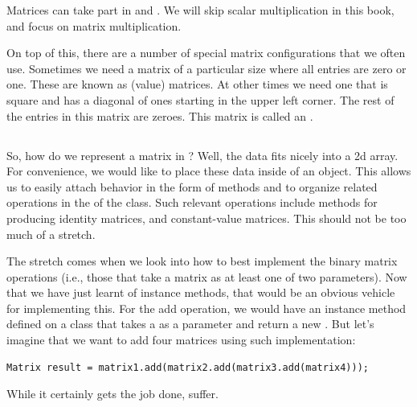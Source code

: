 Matrices can take part in  and . We will skip scalar multiplication in this book, and focus on matrix multiplication.


On top of this, there are a number of special matrix configurations that we often use. Sometimes we need a matrix of a particular size where all entries are zero or one. These are known as  (value) matrices. At other times we need one that is square and has a diagonal of ones starting in the upper left corner. The rest of the entries in this matrix are zeroes. This matrix is called an .

\subsection{\csharp}

So, how do we represent a matrix in \csharp? Well, the data fits nicely into a 2d array. For convenience, we would like to place these data inside of an object. This allows us to easily attach behavior in the form of methods and to organize related operations in the  of the class. Such relevant operations include methods for producing identity matrices, and constant-value matrices. This should not be too much of a stretch.

The stretch comes when we look into how to best implement the binary matrix operations (i.e., those that take a matrix as at least one of two parameters). Now that we have just learnt of instance methods, that would be an obvious vehicle for implementing this. For the add operation, we would have an instance method defined on a  class that takes a  as a parameter and return a new . But let's imagine that we want to add four matrices using such implementation:
\begin{verbatim}
Matrix result = matrix1.add(matrix2.add(matrix3.add(matrix4)));
\end{verbatim}
While it certainly gets the job done,  suffer.

